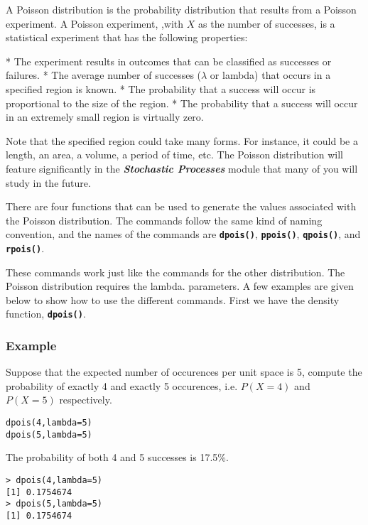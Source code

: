 A Poisson distribution is the probability distribution that results from a Poisson experiment. A Poisson experiment, ,with $X$ as the number of successes, is a statistical experiment that has the following properties: 


\begin{itemize}
*  The experiment results in outcomes that can be classified as successes or failures.
*  The average number of successes ($\lambda$ or lambda) that occurs in a specified region is known.
*  The probability that a success will occur is proportional to the size of the region.
*  The probability that a success will occur in an extremely small region is virtually zero. 
\end{itemize}

Note that the specified region could take many forms. For instance, it could be a length, an area, a volume, a period of time, etc. The Poisson distribution will feature significantly in the \textbf{\textit{Stochastic Processes}} module that many of you will study in the future.

There are four functions that can be used to generate the values associated with the Poisson distribution. 
The commands follow the same kind of naming convention, and the names of the commands are \texttt{\textbf{dpois()}}, \texttt{\textbf{ppois()}}, \texttt{\textbf{qpois()}}, and \texttt{\textbf{rpois()}}.

These commands work just like the commands for the other distribution. The Poisson distribution requires the lambda. parameters. A few examples are given below to show how to use the different commands. First we have the density function, \texttt{\textbf{dpois()}}.

\subsubsection{Example}
Suppose that the expected number of occurences per unit space is 5, compute the probability of exactly 4 and exactly 5 occurences, i.e. $P(X = 4)$ and $P(X = 5)$ respectively.

\begin{framed}
\begin{verbatim}
dpois(4,lambda=5)
dpois(5,lambda=5)
\end{verbatim}
\end{framed}
The probability of both 4 and 5 successes is 17.5\%.
\begin{verbatim}
> dpois(4,lambda=5)
[1] 0.1754674
> dpois(5,lambda=5)
[1] 0.1754674
\end{verbatim}

